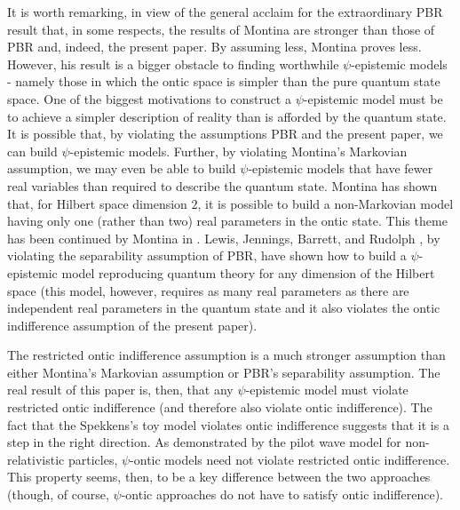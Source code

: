 \documentclass[12pt]{article}
\begin{document}
It is worth remarking, in view of the general acclaim for the extraordinary PBR result that, in some respects, the results of Montina are stronger than those of PBR and, indeed, the present
paper.  By assuming less, Montina proves less.  However, his result is a bigger obstacle to finding worthwhile $\psi$-epistemic models - namely those in which the ontic space is simpler than
the pure quantum state space.  One of the biggest motivations to construct a $\psi$-epistemic model must be to achieve a simpler description of reality than is afforded by the quantum state.
It is possible that, by violating the  assumptions PBR and the present paper, we can build $\psi$-epistemic models. Further, by violating Montina's Markovian assumption, we may even be able
to build $\psi$-epistemic models that have fewer real variables than required to describe the quantum state.   Montina has shown that, for Hilbert space dimension $2$, it is possible to
build a non-Markovian model having only one (rather than two) real parameters in the ontic state. This theme has been continued by Montina in \cite{montina2011dynamics}. Lewis, Jennings,
Barrett, and Rudolph \cite{lewis2012quantum}, by violating the separability assumption of PBR, have shown how to build a $\psi$-epistemic model reproducing quantum theory for any dimension
of the Hilbert space (this model, however, requires as many real parameters as there are independent real parameters in the quantum state and it also violates the ontic indifference
assumption of the present paper).

The restricted ontic indifference assumption is a much stronger assumption than either Montina's Markovian assumption or PBR's separability assumption.  The real result of this paper is, then, that any $\psi$-epistemic model must violate restricted ontic indifference (and therefore also violate ontic indifference).  The fact that the Spekkens's toy model violates ontic indifference suggests that it is a step in the right direction.  As demonstrated by the pilot wave model for non-relativistic particles, $\psi$-ontic models need not violate restricted ontic indifference.  This property seems, then, to be a key difference between the two approaches (though, of course, $\psi$-ontic approaches do not have to satisfy ontic indifference).
\end{document}
